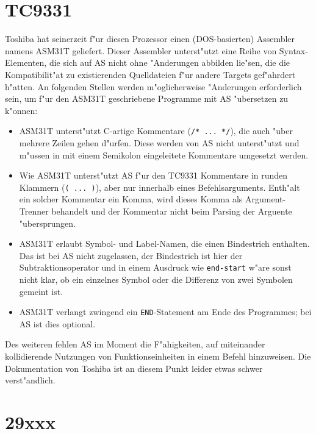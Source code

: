 \documentclass[12pt,a4paper,twoside]{report}
\newcommand{\tty}[1]{{\tt #1}}
\begin{document}
{\section{TC9331}

Toshiba hat seinerzeit f"ur diesen Prozessor einen (DOS-basierten)
Assembler namens ASM31T geliefert.  Dieser Assembler unterst"utzt
eine Reihe von Syntax-Elementen, die sich auf AS nicht ohne
"Anderungen abbilden lie"sen, die die Kompatibilit"at
zu existierenden Quelldateien f"ur andere Targets gef"ahrdert
h"atten.  An folgenden Stellen werden m"oglicherweise "Anderungen
erforderlich sein, um f"ur den ASM31T geschriebene Programme mit
AS "ubersetzen zu k"onnen:

\begin{itemize}
\item{ASM31T unterst"utzt C-artige Kommentare (\verb!/* ... */!),
      die auch "uber mehrere Zeilen gehen d"urfen.  Diese werden
      von AS nicht unterst"utzt und m"ussen in mit einem
      Semikolon eingeleitete Kommentare umgesetzt werden.}
\item{Wie ASM31T unterst"utzt AS f"ur den TC9331 Kommentare in
      runden Klammern (\verb!( ... )!), aber nur innerhalb
      eines Befehlsarguments.  Enth"alt ein solcher Kommentar ein
      Komma, wird dieses Komma als Argument-Trenner behandelt und
      der Kommentar nicht beim Parsing der Arguente
      "ubersprungen.}
\item{ASM31T erlaubt Symbol- und Label-Namen, die einen
      Bindestrich enthalten.  Das ist bei AS nicht zugelassen,
      der Bindestrich ist hier der Subtraktionsoperator und in
      einem Ausdruck wie \verb!end-start! w"are sonst nicht klar,
      ob ein einzelnes Symbol oder die Differenz von zwei
      Symbolen gemeint ist.}
\item{ASM31T verlangt zwingend ein \tty{END}-Statement am Ende
      des Programmes; bei AS ist dies optional.}
\end{itemize}

Des weiteren fehlen AS im Moment die F"ahigkeiten, auf
miteinander kollidierende Nutzungen von Funktionseinheiten in
einem Befehl hinzuweisen.  Die Dokumentation von Toshiba ist an
diesem Punkt leider etwas schwer verst"andlich.


\section{29xxx}

}
\end{document}
